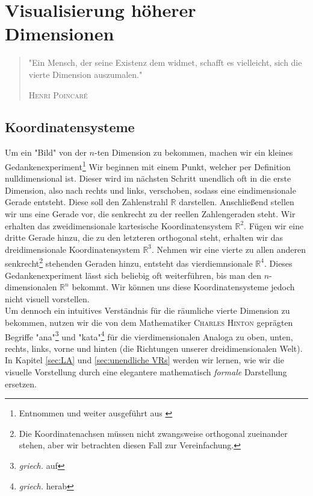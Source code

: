 \chapter{Visualisierung höherer Dimensionen}
\label{sec:Visualisierung}
\begin{quote}
"Ein Mensch, der seine Existenz dem widmet, schafft es vielleicht, sich die vierte Dimension auszumalen."
\begin{flushright}
\textsc{Henri Poincaré}
\end{flushright}
\end{quote}

\section{Koordinatensysteme}
\label{sec:KoS}
Um ein "Bild" von der $n$-ten Dimension zu bekommen, machen wir ein kleines Gedankenexperiment\footnote{Entnommen und weiter ausgeführt aus \cite[S. 71 f.]{Michio}} Wir beginnen mit einem Punkt, welcher per Definition nulldimensional ist. Dieser wird im nächsten Schritt unendlich oft in die erste Dimension, also nach rechts und links, verschoben, sodass eine eindimensionale Gerade entsteht. Diese soll den Zahlenstrahl $\mathbb{R}$ darstellen. Anschließend stellen wir uns eine Gerade vor, die senkrecht zu der reellen Zahlengeraden steht. Wir erhalten das zweidimensionale kartesische Koordinatensystem $\mathbb{R}^2$. Fügen wir eine dritte Gerade hinzu, die zu den letzteren orthogonal steht,  erhalten wir das dreidimensionale Koordinatensystem $\mathbb{R}^3$. 
Nehmen wir eine vierte zu allen anderen senkrecht\footnote{Die Koordinatenachsen müssen nicht zwangsweise orthogonal zueinander stehen, aber wir betrachten diesen Fall zur Vereinfachung.} stehenden Geraden hinzu, entsteht das vierdiemnsionale $\mathbb{R}^4$. Dieses Gedankenexperiment lässt sich beliebig oft weiterführen, bis man den $n$-dimensionalen $\mathbb{R}^n$ bekommt. Wir können uns diese Koordinatensysteme jedoch nicht visuell vorstellen.
\\ \indent Um dennoch ein intuitives Verständnis für die räumliche vierte Dimension zu bekommen, nutzen wir die von dem Mathematiker \textsc{Charles Hinton} geprägten Begriffe "ana"\footnote{\textit{griech.} auf} und "kata"\footnote{\textit{griech.} herab} für die vierdimensionalen Analoga zu oben, unten, rechts, links, vorne und hinten (die Richtungen unserer dreidimensionalen Welt). In Kapitel \ref{sec:LA} und \ref{sec:unendliche VRs} werden wir lernen, wie wir die visuelle Vorstellung durch eine elegantere mathematisch \emph{formale} Darstellung ersetzen.


